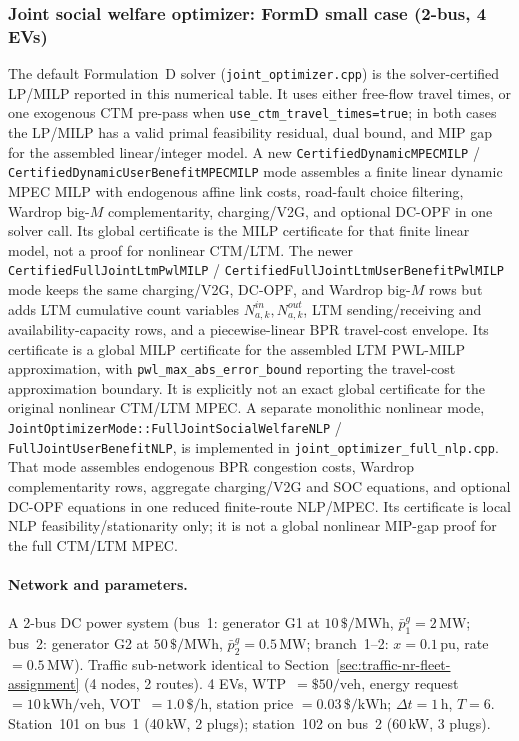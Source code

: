 \subsubsection{Joint social welfare optimizer: FormD small case (2-bus, 4 EVs)}
\label{sec:traffic-nr-formd}

\begin{remark}
  The default Formulation~D solver (\texttt{joint\_optimizer.cpp}) is the
  solver-certified LP/MILP reported in this numerical table.  It uses either
  free-flow travel times, or one exogenous CTM pre-pass when
  \texttt{use\_ctm\_travel\_times=true}; in both cases the LP/MILP has a
  valid primal feasibility residual, dual bound, and MIP gap for the assembled
  linear/integer model.  A new
  \texttt{CertifiedDynamicMPECMILP} /
  \texttt{CertifiedDynamicUserBenefitMPECMILP} mode assembles a finite
  linear dynamic MPEC MILP with endogenous affine link costs, road-fault
  choice filtering, Wardrop big-\(M\) complementarity, charging/V2G, and
  optional DC-OPF in one solver call.  Its global certificate is the MILP
  certificate for that finite linear model, not a proof for nonlinear CTM/LTM.
  The newer
  \texttt{CertifiedFullJointLtmPwlMILP} /
  \texttt{CertifiedFullJointLtmUserBenefitPwlMILP} mode keeps the same
  charging/V2G, DC-OPF, and Wardrop big-\(M\) rows but adds LTM cumulative
  count variables \(N^{in}_{a,k},N^{out}_{a,k}\), LTM sending/receiving and
  availability-capacity rows, and a piecewise-linear BPR travel-cost envelope.
  Its certificate is a global MILP certificate for the assembled LTM
  PWL-MILP approximation, with \texttt{pwl\_max\_abs\_error\_bound} reporting
  the travel-cost approximation boundary.  It is explicitly not an exact
  global certificate for the original nonlinear CTM/LTM MPEC.
  A separate monolithic nonlinear mode,
  \texttt{JointOptimizerMode::FullJointSocialWelfareNLP} /
  \texttt{FullJointUserBenefitNLP}, is implemented in
  \texttt{joint\_optimizer\_full\_nlp.cpp}.  That mode assembles endogenous
  BPR congestion costs, Wardrop complementarity rows, aggregate charging/V2G
  and SOC equations, and optional DC-OPF equations in one reduced finite-route
  NLP/MPEC.  Its certificate is local NLP feasibility/stationarity only; it is
  not a global nonlinear MIP-gap proof for the full CTM/LTM MPEC.
\end{remark}

\paragraph{Network and parameters.}
A 2-bus DC power system (bus~1: generator G1 at $10\,\$/\text{MWh}$,
$\bar{p}^g_1 = 2\,\text{MW}$; bus~2: generator G2 at $50\,\$/\text{MWh}$,
$\bar{p}^g_2 = 0.5\,\text{MW}$; branch~1--2: $x = 0.1\,\text{pu}$,
rate $= 0.5\,\text{MW}$).
Traffic sub-network identical to Section~\ref{sec:traffic-nr-fleet-assignment}
(4 nodes, 2 routes).  4 EVs, WTP~$= \$50/\text{veh}$, energy request
$= 10\,\text{kWh/veh}$, VOT~$= 1.0\,\$/\text{h}$, station price
$= 0.03\,\$/\text{kWh}$; $\Delta t = 1\,\text{h}$, $T = 6$.
Station~101 on bus~1 (40\,kW, 2 plugs); station~102 on bus~2 (60\,kW,
3 plugs).

